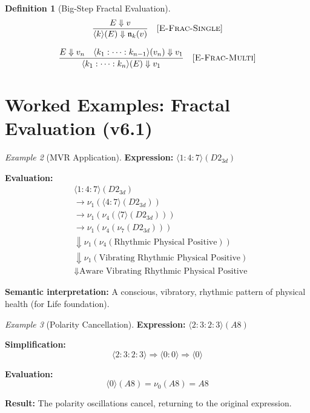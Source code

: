 \documentclass[11pt,twoside,openright]{book}
\theoremstyle{definition}
\newtheorem{definition}{Definition}[chapter]
\theoremstyle{plain}
\theoremstyle{remark}
\newtheorem{example}[definition]{Example}
\newcommand{\noe}[1]{\nu_{#1}}
\newcommand{\smallstep}{\to}
\newcommand{\bigstep}{\Downarrow}
\begin{document}
\begin{definition}[Big-Step Fractal Evaluation]
\label{def:fractal-bigstep}
\[
\frac{E \bigstep v}{\langle k \rangle(E) \bigstep \mathfrak{n}_k(v)} \quad [\textsc{E-Frac-Single}]
\]

\[
\frac{E \bigstep v_n \quad \langle k_1 : \cdots : k_{n-1} \rangle(v_n) \bigstep v_1}{\langle k_1 : \cdots : k_n \rangle(E) \bigstep v_1} \quad [\textsc{E-Frac-Multi}]
\]
\end{definition}

\section{Worked Examples: Fractal Evaluation (v6.1)}

\begin{example}[MVR Application]
\label{ex:mvr-application}
\textbf{Expression:} $\langle 1 : 4 : 7 \rangle(D2_{3d})$

\textbf{Evaluation:}
\begin{align}
&\langle 1 : 4 : 7 \rangle(D2_{3d}) \\
&\smallstep \noe{1}(\langle 4 : 7 \rangle(D2_{3d})) \\
&\smallstep \noe{1}(\noe{4}(\langle 7 \rangle(D2_{3d}))) \\
&\smallstep \noe{1}(\noe{4}(\noe{7}(D2_{3d}))) \\
&\bigstep \noe{1}(\noe{4}(\text{Rhythmic Physical Positive})) \\
&\bigstep \noe{1}(\text{Vibrating Rhythmic Physical Positive}) \\
&\bigstep \text{Aware Vibrating Rhythmic Physical Positive}
\end{align}

\textbf{Semantic interpretation:} A conscious, vibratory, rhythmic pattern of physical health (for Life foundation).
\end{example}

\begin{example}[Polarity Cancellation]
\label{ex:polarity-cancel}
\textbf{Expression:} $\langle 2 : 3 : 2 : 3 \rangle(A8)$

\textbf{Simplification:}
\[
\langle 2 : 3 : 2 : 3 \rangle \Rightarrow \langle 0 : 0 \rangle \Rightarrow \langle 0 \rangle
\]

\textbf{Evaluation:}
\[
\langle 0 \rangle(A8) = \noe{0}(A8) = A8
\]

\textbf{Result:} The polarity oscillations cancel, returning to the original expression.
\end{example}
\end{document}
